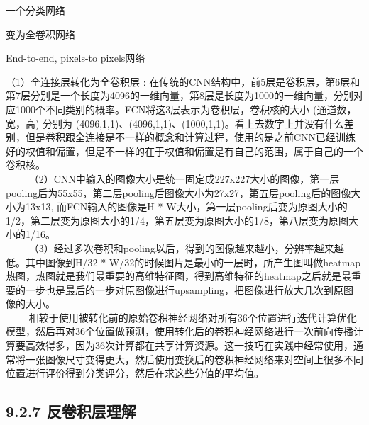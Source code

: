 \begin{figure}
\centering
\end{figure}

一个分类网络

\begin{figure}
\centering
\end{figure}

变为全卷积网络

\begin{figure}
\centering
\end{figure}

End-to-end, pixels-to pixels网络

\begin{figure}
\centering
\end{figure}

（1）全连接层转化为全卷积层 :
在传统的CNN结构中，前5层是卷积层，第6层和第7层分别是一个长度为4096的一维向量，第8层是长度为1000的一维向量，分别对应1000个不同类别的概率。FCN将这3层表示为卷积层，卷积核的大小
(通道数，宽，高) 分别为
(4096,1,1)、(4096,1,1)、(1000,1,1)。看上去数字上并没有什么差别，但是卷积跟全连接是不一样的概念和计算过程，使用的是之前CNN已经训练好的权值和偏置，但是不一样的在于权值和偏置是有自己的范围，属于自己的一个卷积核。\\
  
（2）CNN中输入的图像大小是统一固定成227x227大小的图像，第一层pooling后为55x55，第二层pooling后图像大小为27x27，第五层pooling后的图像大小为13x13,
而FCN输入的图像是H *
W大小，第一层pooling后变为原图大小的1/2，第二层变为原图大小的1/4，第五层变为原图大小的1/8，第八层变为原图大小的1/16。\\
  
（3）经过多次卷积和pooling以后，得到的图像越来越小，分辨率越来越低。其中图像到H/32
*
W/32的时候图片是最小的一层时，所产生图叫做heatmap热图，热图就是我们最重要的高维特征图，得到高维特征的heatmap之后就是最重要的一步也是最后的一步对原图像进行upsampling，把图像进行放大几次到原图像的大小。\\
  
相较于使用被转化前的原始卷积神经网络对所有36个位置进行迭代计算优化模型，然后再对36个位置做预测，使用转化后的卷积神经网络进行一次前向传播计算要高效得多，因为36次计算都在共享计算资源。这一技巧在实践中经常使用，通常将一张图像尺寸变得更大，然后使用变换后的卷积神经网络来对空间上很多不同位置进行评价得到分类评分，然后在求这些分值的平均值。

\subsection{9.2.7
反卷积层理解}\label{ux53cdux5377ux79efux5c42ux7406ux89e3}

